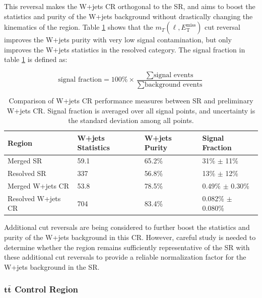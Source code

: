 \documentclass[12pt]{article}
\newcommand*{\met}{\ensuremath{E_\text{T}^\text{miss}} }
\begin{document}
This reversal makes the W+jets CR orthogonal to the SR, and aims to boost the statistics and purity of the W+jets background without drastically changing the kinematics of the region. Table \ref{tab:crw_info} shows that the $m_T(\ell, \met)$ cut reversal improves the W+jets purity with very low signal contamination, but only improves the W+jets statistics in the resolved category. The signal fraction in table \ref{tab:crw_info} is defined as:

\begin{equation}
\text{signal fraction} = 100\% \times \frac{\sum \text{signal events}}{\sum \text{background events}}
\end{equation}

\begin{table}[H]
\centering
\caption{Comparison of W+jets CR performance measures between SR and preliminary W+jets CR. Signal fraction is averaged over all signal points, and uncertainty is the standard deviation among all points.}
\label{tab:crw_info}
\begin{footnotesize}
\renewcommand{\arraystretch}{1.5}
\begin{tabular}{|p{30mm}|p{25mm}|p{25mm}|p{45mm}|}
\hline
\textbf{Region} & \textbf{W+jets Statistics} & \textbf{W+jets Purity} & \textbf{Signal Fraction}   \\ \hline
Merged SR    & 59.1 & 65.2\% & 31\% $\pm$ 11\%        \\ \hline
Resolved SR    & 337 & 56.8\% & 13\% $\pm$ 12\%        \\ \hline
Merged W+jets CR    & 53.8 & 78.5\% & 0.49\% $\pm$ 0.30\%        \\ \hline
Resolved W+jets CR    & 704 & 83.4\% & 0.082\% $\pm$ 0.080\%        \\ \hline
\end{tabular}
\end{footnotesize}
\end{table}

Additional cut reversals are being considered to further boost the statistics and purity of the W+jets background in this CR. However, careful study is needed to determine whether the region remains sufficiently representative of the SR with these additional cut reversals to provide a reliable normalization factor for the W+jets background in the SR. 

\subsubsection{$\bm{t\bar{t}}$ Control Region}
\end{document}
